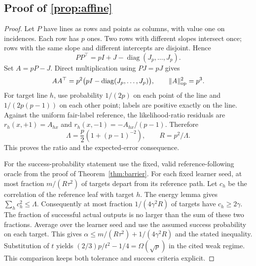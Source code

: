 \subsection[Proof of result affine]{Proof of \cref{prop:affine}}\label{proof:affine}
\begin{proof}
Let $P$ have lines as rows and points as columns, with value one on incidences. Each row has $p$ ones. Two rows with different slopes intersect once; rows with the same slope and different intercepts are disjoint. Hence
\[
 PP^\top=pI+J-\operatorname{diag}(J_p,\ldots,J_p).
\]
Set $A=pP-J$. Direct multiplication using $PJ=pJ$ gives
\[
 AA^\top=p^2\bigl(pI-\operatorname{diag}(J_p,\ldots,J_p)\bigr),
 \qquad \|A\|_{\rm op}^2=p^3.
\]
For target line $h$, use probability $1/(2p)$ on each point of the line and $1/(2p(p-1))$ on each other point; labels are positive exactly on the line. Against the uniform fair-label reference, the likelihood-ratio residuals are $r_h(x,+1)=A_{hx}$ and $r_h(x,-1)=-A_{hx}/(p-1)$. Therefore
\[
 \Lambda=\frac p2(1+(p-1)^{-2}),\qquad R=p^2/\Lambda.
\]
This proves the ratio and the expected-error consequence.

For the success-probability statement use the fixed, valid reference-following oracle from the proof of Theorem~\ref{thm:barrier}. For each fixed learner seed, at most fraction $m/(R\tau^2)$ of targets depart from its reference path. Let $c_h$ be the correlation of the reference leaf with target $h$. The energy lemma gives $\sum_hc_h^2\le\Lambda$. Consequently at most fraction $1/(4\gamma^2R)$ of targets have $c_h\ge2\gamma$. The fraction of successful actual outputs is no larger than the sum of these two fractions. Average over the learner seed and use the assumed success probability on each target. This gives $\alpha\le m/(R\tau^2)+1/(4\gamma^2R)$ and the stated inequality. Substitution of $t$ yields $(2/3)p/t^2-1/4=\Omega(\sqrt p)$ in the cited weak regime. This comparison keeps both tolerance and success criteria explicit.
\end{proof}

